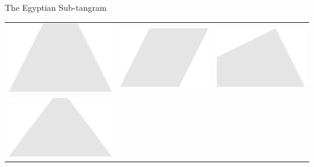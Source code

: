 \documentclass[14pt]{beamer}
\begin{document}
\begin{frame}{The Egyptian Sub-tangram}
\begin{center}
\begin{tabular}{ccc}
                    \includegraphics[scale=0.3]{figures/figure023d.pdf} \;\;&
                \;\;\includegraphics[scale=0.3]{figures/figure023f.pdf} \;\;&
                \;\;\includegraphics[scale=0.3]{figures/figure023h.pdf} \\[2ex]
                    \includegraphics[scale=0.3]{figures/figure023e.pdf} \;\;&

\end{tabular}
\end{center}
\end{frame}
\end{document}
